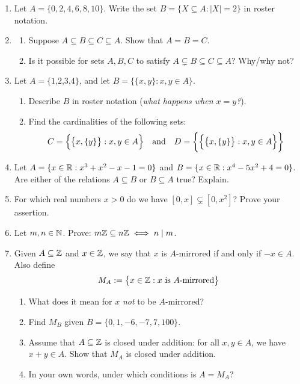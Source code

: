 \begin{exercises}{}{}
\begin{enumerate}
	  \item Let $A=\{0,2,4,6,8,10\}$. Write the set $B=\{X\subseteq A:|X|=2\}$ in roster notation.
	  
	    
	  \item\begin{enumerate}
	    \item Suppose $A\subseteq B\subseteq C\subseteq A$. Show that $A=B=C$.
	    \item Is it possible for sets $A,B,C$ to satisfy $A\subsetneq B\subseteq C\subseteq A$? Why/why not?
	  \end{enumerate}

	
		\item Let $A=\{\text{1,2,3,4}\}$, and let $B =\bigl\{\{x,y\}:x,y\in A\bigr\}$.
		\begin{enumerate}
	  	\item Describe $B$ in roster notation (\emph{what happens when $x=y$?}).
			\item Find the cardinalities of the following sets:
			\[
				C=\Bigl\{\bigl\{x,\{y\}\bigr\}:x,y\in A\Bigr\}
				\quad\text{and}\quad
				D=\biggl\{\Bigl\{\bigl\{x,\{y\}\bigr\}:x,y\in A\Bigr\}\biggr\}
			\]
		\end{enumerate}
  
  
  	\item Let $A=\{x\in\mathbb{R}:x^3+x^2-x-1=0\}$ and $B=\{x\in\mathbb{R}:x^4-5x^2+4=0\}$. Are either of the relations $A\subseteq B$ or $B\subseteq A$ true? Explain.
  
  
  	\item For which real numbers $x>0$ do we have $[0,x]\subsetneq[0,x^2]$? Prove your assertion.
  
  
  	\item Let $m,n\in\mathbb{N}$. Prove: $m\mathbb{Z}\subseteq n\mathbb{Z}\iff n\mid m$.

  
  	\item\label{ex:mirrored} Given $A\subseteq\mathbb{Z}$ and $x\in\mathbb{Z}$, we say that $x$ is $A$-mirrored if and only if $-x\in A$. Also define
  	\[
			M_A:=\bigl\{x\in\mathbb{Z}: x\text{ is $A$-mirrored}\bigr\}
		\]
		\begin{enumerate}
	  	\item What does it mean for $x$ \emph{not} to be $A$-mirrored?
	  	\item Find $M_B$ given $B=\{0,1,-6,-7,7,100\}$.
	  	\item Assume that $A \subseteq\mathbb{Z}$ is closed under addition: for all $x,y\in A$, we have $x+y\in A$. Show that $M_A$ is closed under addition.
	  	\item In your own words, under which conditions is $A=M_A$?
		\end{enumerate}


\end{enumerate}
\end{exercises}
